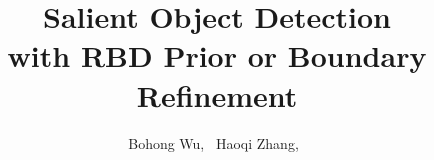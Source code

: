 \documentclass[10pt,journal, compsoc]{IEEEtran}
\begin{document}
	
%
\title{Salient Object Detection\\with RBD Prior or Boundary Refinement}
%
%
%
%

\author{Bohong Wu,~
        Haoqi Zhang,~}

% 
%
\end{document}
